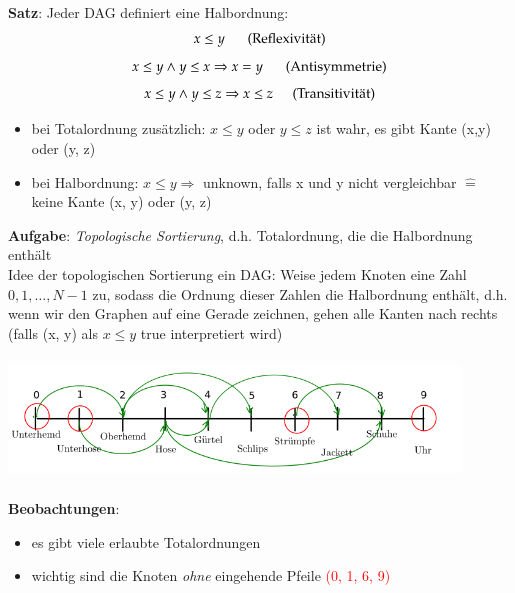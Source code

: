     \textbf{Satz}: Jeder DAG definiert eine Halbordnung:
    \[ x \leq y \hspace*{5mm}\text{ (Reflexivität)}\]
    \[ x \leq y \land y \leq x \Rightarrow x = y\hspace*{5mm} \text{ (Antisymmetrie)}\]
    \[ x \leq y \land y \leq z \Rightarrow x \leq z \hspace*{5mm} \text{(Transitivität)}\]

    \begin{itemize}[label={}]
        \item bei Totalordnung zusätzlich: $x\leq y$ oder $y \leq z$ ist wahr, es gibt Kante (x,y) oder (y, z)
        \item   bei Halbordnung: $x \leq y \Rightarrow$ \glqq unknown\grqq , falls x und y nicht vergleichbar $\widehat{=}$ keine Kante (x, y) oder (y, z)
    \end{itemize}



    \textbf{Aufgabe}: \emph{Topologische Sortierung}, d.h. Totalordnung, die die Halbordnung enthält\\

    Idee der topologischen Sortierung ein DAG: Weise jedem Knoten eine Zahl $0, 1, \dots, N-1$ zu, sodass die Ordnung dieser Zahlen die Halbordnung enthält, d.h. wenn wir den Graphen auf eine Gerade zeichnen, gehen alle Kanten nach rechts (falls (x, y) als $x \leq y$ true interpretiert wird)\\

    \includegraphics[width=12cm,height=4cm,keepaspectratio]{./Pictures/Zeitstrahl.png}\\

    \textbf{Beobachtungen}:
    \begin{itemize}
        \item es gibt viele erlaubte Totalordnungen
        \item wichtig sind die Knoten \emph{ohne} eingehende Pfeile \textcolor{red}{(0, 1, 6, 9)}
    \end{itemize}

